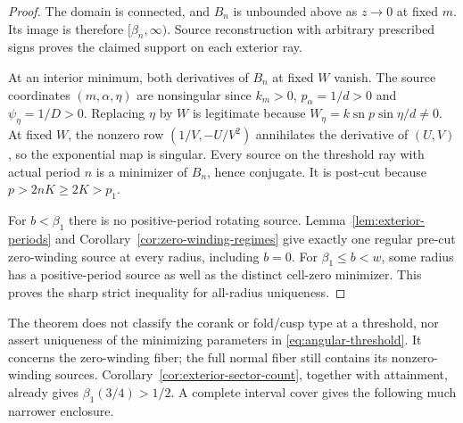 \documentclass[11pt,a4paper]{article}
\theoremstyle{remark}\newtheorem{remark}[theorem]{Remark}
\newcommand{\sn}{\operatorname{sn}}
\begin{document}
\begin{proof}
The domain is connected, and $B_n$ is unbounded above as $z\to0$
at fixed $m$. Its image is therefore $[\beta_n,\infty)$.
Source reconstruction with arbitrary prescribed signs proves the
claimed support on each exterior ray.

At an interior minimum, both derivatives of $B_n$ at fixed $W$ vanish.
The source coordinates $(m,\alpha,\eta)$ are nonsingular since
$k_m>0$, $p_\alpha=1/d>0$ and $\psi_\eta=1/D>0$.
Replacing $\eta$ by $W$ is legitimate because
$W_\eta=k\sn p\sin\eta/d\ne0$.
At fixed $W$, the nonzero row $(1/V,-U/V^2)$ annihilates the
derivative of $(U,V)$, so the exponential map is singular.
Every source on the threshold ray with actual period $n$ is a
minimizer of $B_n$, hence conjugate. It is post-cut because
$p>2nK\ge2K>p_1$.

For $b<\beta_1$ there is no positive-period rotating source.
Lemma~\ref{lem:exterior-periods} and
Corollary~\ref{cor:zero-winding-regimes} give exactly one regular
pre-cut zero-winding source at every radius, including $b=0$.
For $\beta_1\le b<w$, some radius has a positive-period source
as well as the distinct cell-zero minimizer. This proves the sharp
strict inequality for all-radius uniqueness.
\end{proof}

The theorem does not classify the corank or fold/cusp type at a
threshold, nor assert uniqueness of the minimizing parameters in
\eqref{eq:angular-threshold}. It concerns the zero-winding fiber;
the full normal fiber still contains its nonzero-winding sources.
Corollary~\ref{cor:exterior-sector-count}, together with attainment,
already gives $\beta_1(3/4)>1/2$. A complete interval cover gives
the following much narrower enclosure.
\end{document}
